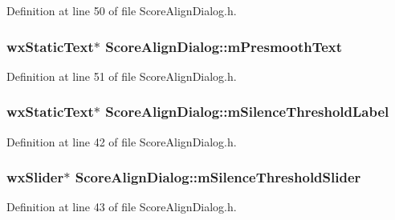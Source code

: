 Definition at line 50 of file Score\+Align\+Dialog.\+h.

\subsubsection[{\texorpdfstring{m\+Presmooth\+Text}{mPresmoothText}}]{\setlength{\rightskip}{0pt plus 5cm}wx\+Static\+Text$\ast$ Score\+Align\+Dialog\+::m\+Presmooth\+Text}\hypertarget{class_score_align_dialog_a4099e57477afc0e51a6133bc8191b62d}{}\label{class_score_align_dialog_a4099e57477afc0e51a6133bc8191b62d}


Definition at line 51 of file Score\+Align\+Dialog.\+h.

\subsubsection[{\texorpdfstring{m\+Silence\+Threshold\+Label}{mSilenceThresholdLabel}}]{\setlength{\rightskip}{0pt plus 5cm}wx\+Static\+Text$\ast$ Score\+Align\+Dialog\+::m\+Silence\+Threshold\+Label}\hypertarget{class_score_align_dialog_a92aa136b50ca96ba9815bcdb3322d249}{}\label{class_score_align_dialog_a92aa136b50ca96ba9815bcdb3322d249}


Definition at line 42 of file Score\+Align\+Dialog.\+h.

\subsubsection[{\texorpdfstring{m\+Silence\+Threshold\+Slider}{mSilenceThresholdSlider}}]{\setlength{\rightskip}{0pt plus 5cm}wx\+Slider$\ast$ Score\+Align\+Dialog\+::m\+Silence\+Threshold\+Slider}\hypertarget{class_score_align_dialog_a71c03fdeb899de5c5abe184d96fa5fd3}{}\label{class_score_align_dialog_a71c03fdeb899de5c5abe184d96fa5fd3}


Definition at line 43 of file Score\+Align\+Dialog.\+h.

